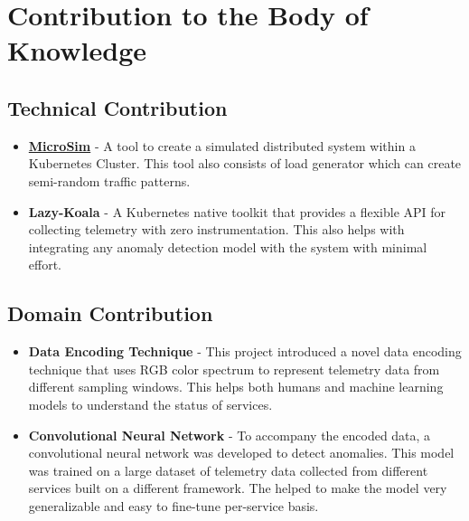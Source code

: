 \section{Contribution to the Body of Knowledge}

\subsection{Technical Contribution}

\begin{itemize}[noitemsep,nolistsep]
    \item \textbf{\href{https://github.com/MrSupiri/MicroSim}{MicroSim}} - A tool to create a simulated distributed system within a Kubernetes Cluster. This tool also consists of load generator which can create semi-random traffic patterns.
    \item \textbf{Lazy-Koala} - A Kubernetes native toolkit that provides a flexible API for collecting telemetry with zero instrumentation. This also helps with integrating any anomaly detection model with the system with minimal effort.
\end{itemize} 

\subsection{Domain Contribution}

\begin{itemize}[noitemsep,nolistsep]
    \item \textbf{Data Encoding Technique} - This project introduced a novel data encoding technique that uses RGB color spectrum to represent telemetry data from different sampling windows. This helps both humans and machine learning models to understand the status of services.
    \item \textbf{Convolutional Neural Network} - To accompany the encoded data, a convolutional neural network was developed to detect anomalies. This model was trained on a large dataset of telemetry data collected from different services built on a different framework. The helped to make the model very generalizable and easy to fine-tune per-service basis.
\end{itemize} 